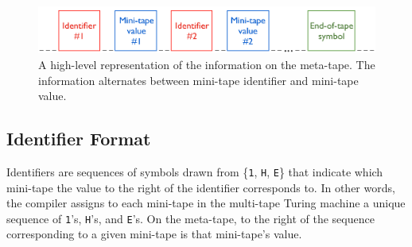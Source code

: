 \documentclass[11pt]{report}
\begin{document}

\begin{figure} 
\begin{center} 
\includegraphics[scale=0.4]{figs/stmstmlayout.png} 
\caption{A high-level representation of the information on the meta-tape. The information alternates between mini-tape identifier and mini-tape value. \label{fig:stmstmlayout}}
\end{center} 
\end{figure}

\subsection{Identifier Format}

Identifiers are sequences of symbols drawn from \{\texttt{1}, \texttt{H}, \texttt{E}\} that indicate which mini-tape the value to the right of the identifier corresponds to. In other words, the compiler assigns to each mini-tape in the multi-tape Turing machine a unique sequence of \texttt{1}'s, \texttt{H}'s, and \texttt{E}'s. On the meta-tape, to the right of the sequence corresponding to a given mini-tape is that mini-tape's value. \\
\end{document}
